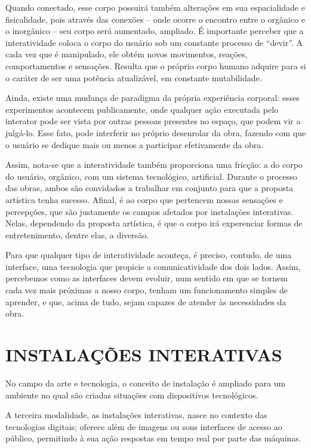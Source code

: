 Quando conectado, esse corpo possuirá também alterações em sua espacialidade e fisicalidade, pois através das conexões – onde ocorre o encontro entre o orgânico e o inorgânico – seu corpo será aumentado, ampliado. É importante perceber que a interatividade coloca o corpo do usuário sob um constante processo de “devir”. A cada vez que é manipulado, ele obtém novos movimentos, reações, comportamentos e sensações. Resulta que o próprio corpo humano adquire para si o caráter de ser uma potência atualizável, em constante mutabilidade.\cite{vares}


Ainda, existe uma mudança de paradigma da própria experiência corporal: esses experimentos acontecem publicamente, onde qualquer ação executada pelo interator pode ser vista por outras pessoas presentes no espaço, que podem vir a julgá-lo. Esse fato, pode interferir no próprio desenrolar da obra, fazendo com que o usuário se dedique mais ou menos a participar efetivamente da obra.\cite{vares}


Assim, nota-se que a interatividade também proporciona uma fricção: a do corpo do usuário, orgânico, com um sistema tecnológico, artificial. Durante o processo das obras, ambos são convidados a trabalhar em conjunto para que a proposta artística tenha sucesso. Afinal, é ao corpo que pertencem nossas sensações e percepções, que são justamente os campos afetados por instalações interativas. Nelas, dependendo da proposta artística, é que o corpo irá experenciar formas de entretenimento, dentre elas, a diversão. \cite{witt}

Para que qualquer tipo de interatividade aconteça, é preciso, contudo, de uma interface, uma tecnologia que propicie a comunicatividade dos dois lados. Assim, percebemos como as interfaces devem evoluir, num sentido em que se tornem cada vez mais próximas a nosso corpo, tenham um funcionamento simples de aprender, e que, acima de tudo, sejam capazes de atender às necessidades da obra. \cite{witt}


\section{INSTALAÇÕES INTERATIVAS}

No campo da arte e tecnologia, o conceito de instalação é ampliado para um ambiente no qual são criadas situações com dispositivos tecnológicos. \cite[p. 5]{bochio}

A terceira modalidade, as instalações interativas, nasce no contexto das tecnologias digitais; oferece além de imagens ou sons interfaces de acesso ao público, permitindo à sua ação respostas em tempo real por parte das máquinas. \cite[p. 6]{bochio}

